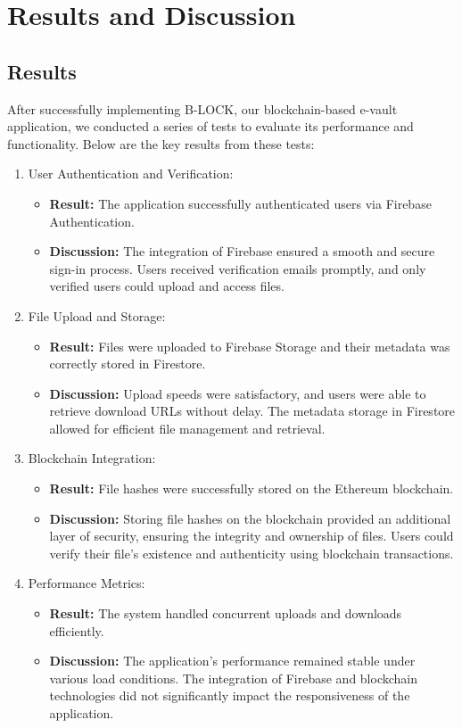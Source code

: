 \documentclass[12pt,a4paper]{report}
\begin{document}
\chapter{Results and Discussion}
\section{Results}
\par After successfully implementing B-LOCK, our blockchain-based e-vault application, we conducted a series of tests to evaluate its performance and functionality. Below are the key results from these tests:
\begin{enumerate}
   \item User Authentication and Verification:
   \begin{itemize}
      \item \textbf{Result:} The application successfully authenticated users via Firebase Authentication.
      \item \textbf{Discussion:} The integration of Firebase ensured a smooth and secure sign-in process. Users received verification emails promptly, and only verified users could upload and access files.
   \end{itemize}
   \item File Upload and Storage:
   \begin{itemize}
      \item \textbf{Result:} Files were uploaded to Firebase Storage and their metadata was correctly stored in Firestore.
      \item \textbf{Discussion:} Upload speeds were satisfactory, and users were able to retrieve download URLs without delay. The metadata storage in Firestore allowed for efficient file management and retrieval.
   \end{itemize}
   \item Blockchain Integration:
   \begin{itemize}
      \item \textbf{Result:} File hashes were successfully stored on the Ethereum blockchain.
      \item \textbf{Discussion:} Storing file hashes on the blockchain provided an additional layer of security, ensuring the integrity and ownership of files. Users could verify their file's existence and authenticity using blockchain transactions.
   \end{itemize}
   \item Performance Metrics:
   \begin{itemize}
      \item \textbf{Result:} The system handled concurrent uploads and downloads efficiently.
      \item \textbf{Discussion:} The application's performance remained stable under various load conditions. The integration of Firebase and blockchain technologies did not significantly impact the responsiveness of the application.
   \end{itemize}
\end{enumerate}
\end{document}
